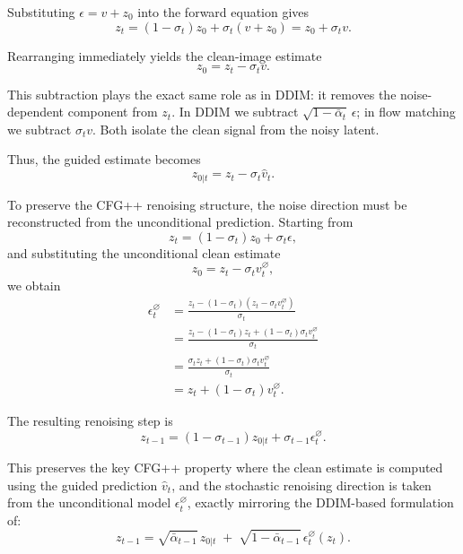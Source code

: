 \documentclass[acmtog]{acmart}
\begin{document}
Substituting $\epsilon = v + z_0$ into the forward equation gives
\begin{equation}
z_t = (1 - \sigma_t)z_0 + \sigma_t(v + z_0)
     = z_0 + \sigma_t v.
\end{equation}

Rearranging immediately yields the clean-image estimate
\begin{equation}
z_0 = z_t - \sigma_t v.
\end{equation}

This subtraction plays the exact same role as in DDIM: it removes the noise-dependent component from $z_t$.
In DDIM we subtract $\sqrt{1-\bar{\alpha}_t}\,\epsilon$;
in flow matching we subtract $\sigma_t v$.
Both isolate the clean signal from the noisy latent.

\medskip

Thus, the guided estimate becomes
\begin{equation}
z_{0|t} = z_t - \sigma_t \hat{v}_t.
\end{equation}

To preserve the CFG++ renoising structure, the noise direction must be reconstructed from the unconditional prediction. Starting from
\begin{equation}
z_t = (1 - \sigma_t)z_0 + \sigma_t\epsilon,
\end{equation}
and substituting the unconditional clean estimate
\begin{equation}
z_0 = z_t - \sigma_t v_t^{\varnothing},
\end{equation}
we obtain
\begin{equation}
\begin{aligned}
\epsilon_t^{\varnothing}
&=
\frac{z_t - (1-\sigma_t)(z_t - \sigma_t v_t^{\varnothing})}{\sigma_t} \\
&=
\frac{z_t - (1-\sigma_t)z_t + (1-\sigma_t)\sigma_t v_t^{\varnothing}}{\sigma_t} \\
&=
\frac{\sigma_t z_t + (1-\sigma_t)\sigma_t v_t^{\varnothing}}{\sigma_t} \\
&=
z_t + (1-\sigma_t)v_t^{\varnothing}.
\end{aligned}
\end{equation}

The resulting renoising step is
\begin{equation}
z_{t-1} =
(1 - \sigma_{t-1}) z_{0|t}
+
\sigma_{t-1} \epsilon_t^{\varnothing}.
\end{equation}

This preserves the key CFG++ property where the clean estimate is computed using the guided prediction $\hat{v}_t$, and the stochastic renoising direction is taken from the unconditional model $\epsilon_t^{\varnothing}$, exactly mirroring the DDIM-based formulation of:
\begin{equation}
z_{t-1} = \sqrt{\bar{\alpha}_{t-1}} \, z_{0|t}
\;+\;
\sqrt{1-\bar{\alpha}_{t-1}} \, \epsilon^{\varnothing}_t(z_t).
\end{equation}
\end{document}
